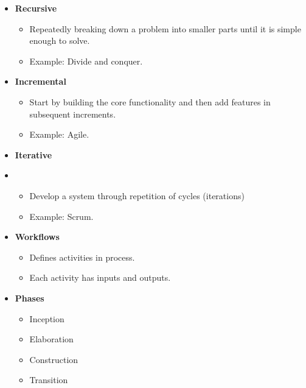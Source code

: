 \documentclass[10pt]{article}
\begin{document}
\begin{multicols}{5}
  \begin{block}
  \begin{itemize}
    \item \textbf{Recursive}
    \begin{itemize}
      \item Repeatedly breaking down a problem into smaller parts until it is simple enough to solve.
      \item Example: Divide and conquer.
    \end{itemize}
    \item \textbf{Incremental}
    \begin{itemize}
      \item Start by building the core functionality and then add features in subsequent increments.
      \item Example: Agile.
    \end{itemize}
    \item \textbf{Iterative}
    \item \begin{itemize}
      \item Develop a system through repetition of cycles (iterations)
      \item Example: Scrum.
    \end{itemize}
  \end{itemize}
  \end{block}

  
  \begin{block}
    \begin{itemize}
      \item \textbf{Workflows}
      \begin{itemize}
        \item Defines activities in process.
        \item Each activity has inputs and outputs.
      \end{itemize}
      \item \textbf{Phases}
      \begin{itemize}
        \item Inception
        \item Elaboration
        \item Construction
        \item Transition
      \end{itemize}
    \end{itemize}
  \end{block}
  

\end{multicols}
\end{document}
